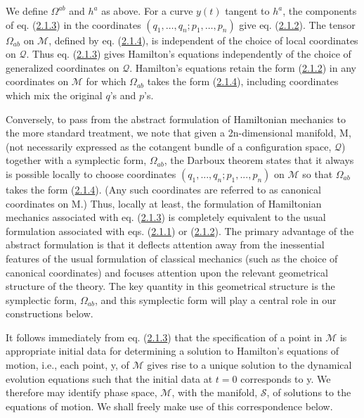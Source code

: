 \documentclass[11pt,a4paper]{article}
\begin{document}
We define \(\Omega^{ab}\) and \(h^a\) as above. For a curve \(y(t)\) tangent to \(h^a\), the components of eq. (\hyperref[eq:2.1.3]{2.1.3}) in the coordinates \((q_1,\ldots,q_n;p_1,\ldots,p_n)\) give eq. (\hyperref[eq:2.1.2]{2.1.2}). The tensor \(\Omega_{ab}\) on \(\mathcal{M}\), defined by eq. (\hyperref[eq:2.1.4]{2.1.4}), is independent of the choice of \hypertarget{source-26}{}local coordinates on \(\mathcal{Q}\). Thus eq. (\hyperref[eq:2.1.3]{2.1.3}) gives Hamilton's equations independently of the choice of generalized coordinates on \(\mathcal{Q}\). Hamilton's equations retain the form (\hyperref[eq:2.1.2]{2.1.2}) in any coordinates on \(\mathcal{M}\) for which \(\Omega_{ab}\) takes the form (\hyperref[eq:2.1.4]{2.1.4}), including coordinates which mix the original \(q\)'s and \(p\)'s.

Conversely, to pass from the abstract formulation of Hamiltonian mechanics to the more standard treatment, we note that given a 2n-dimensional manifold, M, (not necessarily expressed as the cotangent bundle of a configuration space, \(\mathcal{Q}\)) together with a symplectic form, \(\Omega_{ab}\), the Darboux theorem states that it always is possible locally to choose coordinates \((q_1,...,q_n; p_1,...,p_n)\) on \(\mathcal{M}\) so that \(\Omega_{ab}\) takes the form (\hyperref[eq:2.1.4]{2.1.4}). (Any such coordinates are referred to as canonical coordinates on M.) Thus, locally at least, the formulation of Hamiltonian mechanics associated with eq. (\hyperref[eq:2.1.3]{2.1.3}) is completely equivalent to the usual formulation associated with eqs. (\hyperref[eq:2.1.1]{2.1.1}) or (\hyperref[eq:2.1.2]{2.1.2}). The primary advantage of the abstract formulation is that it deflects attention away from the inessential features of the usual formulation of classical mechanics (such as the choice of canonical coordinates) and focuses attention upon the relevant geometrical structure of the theory. The key quantity in this geometrical structure is the symplectic form, \(\Omega_{ab}\), and this symplectic form will play a central role in our constructions below.

It follows immediately from eq. (\hyperref[eq:2.1.3]{2.1.3}) that the specification of a point in \(\mathcal{M}\) is appropriate initial data for determining a solution to Hamilton's equations of motion, i.e., each point, y, of \(\mathcal{M}\) gives rise to a unique solution to the dynamical evolution equations such that the initial data at \(t=0\) corresponds to y. We therefore may identify phase space, \(\mathcal{M}\), with the manifold, \(\mathcal S\), of solutions to the equations of motion. We shall freely make use of this correspondence below.
\end{document}
